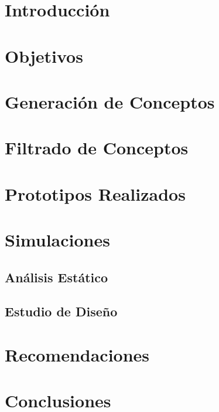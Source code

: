 \documentclass[letterpaper,12pt]{article}
\begin{document}


\needspace{3cm}
\section{Introducción}


\needspace{3cm}
\section{Objetivos}


\needspace{3cm}
\section{Generación de Conceptos}


\needspace{6cm}
\section{Filtrado de Conceptos}


\needspace{6cm}
\section{Prototipos Realizados}


\section{Simulaciones}
\subsection{Análisis Estático}

\subsection{Estudio de Diseño}


\needspace{6cm}
\section{Recomendaciones}


\needspace{6cm}
\section{Conclusiones}


\newpage
\printbibliography


\end{document}
